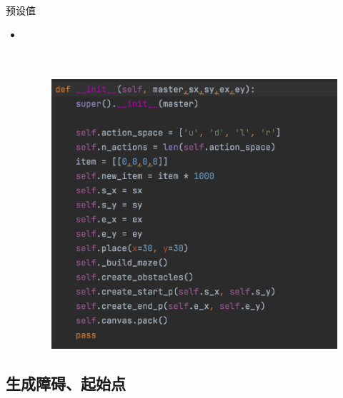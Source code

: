 \documentclass{beamer}
\begin{document}
\begin{frame}{预设值}
    \begin{itemize}
    \item 
    \\
    \\
    \\
    \begin{minipage}{1\linewidth}
        \medskip
        \begin{figure}[h]
            \centering
            \includegraphics[height=.8\textheight]{pic/12.png}
        \end{figure}
    \end{minipage}
    
    \end{itemize}
    
\end{frame}


\subsection{生成障碍、起始点}
\end{document}
